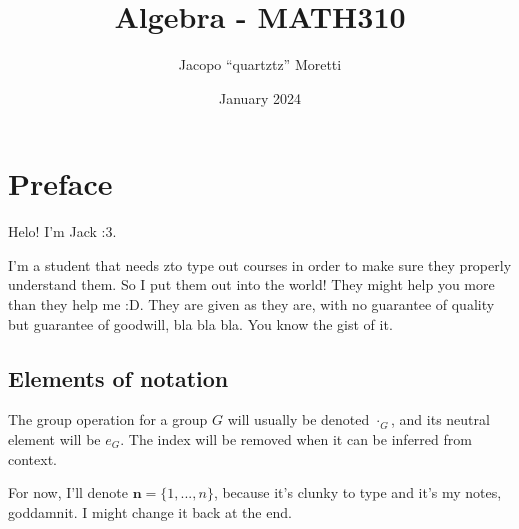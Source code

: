 \documentclass{report} %
\title{Algebra - MATH310}
\author{Jacopo ``quartztz'' Moretti}
\date{January 2024}
\begin{document}
  \maketitle

  \chapter*{Preface}
  Helo! I'm Jack :3.

  I'm a student that needs zto type out courses in order to make sure they properly understand them. So I put them out into the world! They might help you more than they help me :D. They are given as they are, with no guarantee of quality but guarantee of goodwill, bla bla bla. You know the gist of it. 

  \section*{Elements of notation}

  The group operation for a group $G$ will usually be denoted $\cdot_G$, and its neutral element will be $e_G$. The index will be removed when it can be inferred from context. 

  For now, I'll denote $\mathbf{n} = \{1, ..., n\}$, because it's clunky to type and it's my notes, goddamnit. I might change it back at the end.

  \tableofcontents

  \pagebreak

  

  
  
  

  \appendix
  
  
  
\end{document}
